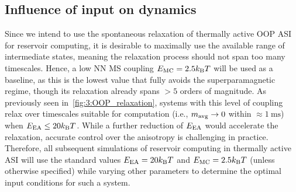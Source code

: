 \subsection{Influence of input on dynamics}
Since we intend to use the spontaneous relaxation of thermally active OOP ASI for reservoir computing, it is desirable to maximally use the available range of intermediate states, meaning the relaxation process should not span too many timescales.
Hence, a low NN MS coupling $\EMC=2.5\kBT$ will be used as a baseline, as this is the lowest value that fully avoids the superparamagnetic regime, though its relaxation already spans $>5$ orders of magnitude.
As previously seen in~\cref{fig:3:OOP_relaxation}, systems with this level of coupling relax over timescales suitable for computation (i.e., $m_\mathrm{avg} \rightarrow 0$ within $\approx \SI{1}{\milli\second}$) when $\EEA \leq 20\kBT$.
While a further reduction of $E_\mathrm{EA}$ would accelerate the relaxation, accurate control over the anisotropy is challenging in practice.
Therefore, all subsequent simulations of reservoir computing in thermally active ASI will use the standard values $\EEA=20\kBT$ and $\EMC=2.5\kBT$ (unless otherwise specified) while varying other parameters to determine the optimal input conditions for such a system.

\vspace{-1.5em}
\vspace{-1em}

